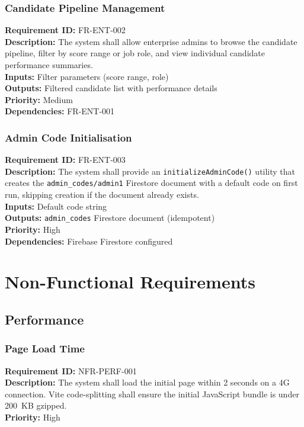 \documentclass{fisatinternship}
\begin{document}
\vspace{0.4cm}

\subsection{Candidate Pipeline Management}
\textbf{Requirement ID:} FR-ENT-002\\
\textbf{Description:} The system shall allow enterprise admins to browse the candidate
pipeline, filter by score range or job role, and view individual candidate performance
summaries.\\
\textbf{Inputs:} Filter parameters (score range, role)\\
\textbf{Outputs:} Filtered candidate list with performance details\\
\textbf{Priority:} Medium\\
\textbf{Dependencies:} FR-ENT-001

\vspace{0.4cm}

\subsection{Admin Code Initialisation}
\textbf{Requirement ID:} FR-ENT-003\\
\textbf{Description:} The system shall provide an \texttt{initializeAdminCode()} utility
that creates the \texttt{admin\_codes/admin1} Firestore document with a default code on
first run, skipping creation if the document already exists.\\
\textbf{Inputs:} Default code string\\
\textbf{Outputs:} \texttt{admin\_codes} Firestore document (idempotent)\\
\textbf{Priority:} High\\
\textbf{Dependencies:} Firebase Firestore configured

\vspace{0.4cm}

\chapter{Non-Functional Requirements}

\section{Performance}

\subsection{Page Load Time}
\textbf{Requirement ID:} NFR-PERF-001\\
\textbf{Description:} The system shall load the initial page within 2 seconds on a 4G
connection. Vite code-splitting shall ensure the initial JavaScript bundle is under
200~KB gzipped.\\
\textbf{Priority:} High
\end{document}
